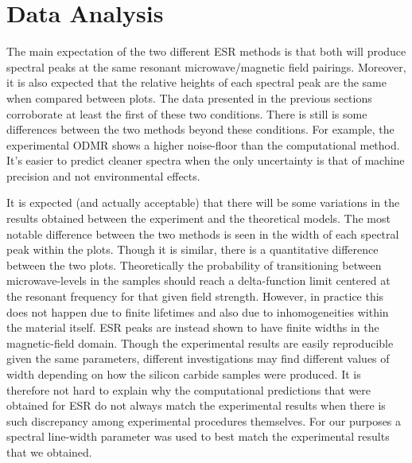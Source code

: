 \documentclass[oneside]{BYUPhys}
\begin{document}
\section{Data Analysis}

The main expectation of the two different ESR methods is that both will produce spectral peaks at the same resonant microwave/magnetic field pairings. Moreover, it is also expected that the relative heights of each spectral peak are the same when compared between plots. The data presented in the previous sections corroborate at least the first of these two conditions. There is still is some differences between the two methods beyond these conditions. For example, the experimental ODMR shows a higher noise-floor than the computational method. It's easier to predict cleaner spectra when the only uncertainty is that of machine precision and not environmental effects.

It is expected (and actually acceptable) that there will be some variations in the results obtained between the experiment and the theoretical models. The most notable difference between the two methods is seen in the width of each spectral peak within the plots. Though it is similar, there is a quantitative difference between the two plots. Theoretically the probability of transitioning between microwave-levels in the samples should reach a delta-function limit centered at the resonant frequency for that given field strength. However, in practice this does not happen due to finite lifetimes and also due to inhomogeneities within the material itself. ESR peaks are instead shown to have finite widths in the magnetic-field domain. Though the experimental results are easily reproducible given the same parameters, different investigations may find different values of width depending on how the silicon carbide samples were produced. It is therefore not hard to explain why the computational predictions that were obtained for ESR do not always match the experimental results when there is such discrepancy among experimental procedures themselves. For our purposes a spectral line-width parameter was used to best match the experimental results that we obtained.
\end{document}
